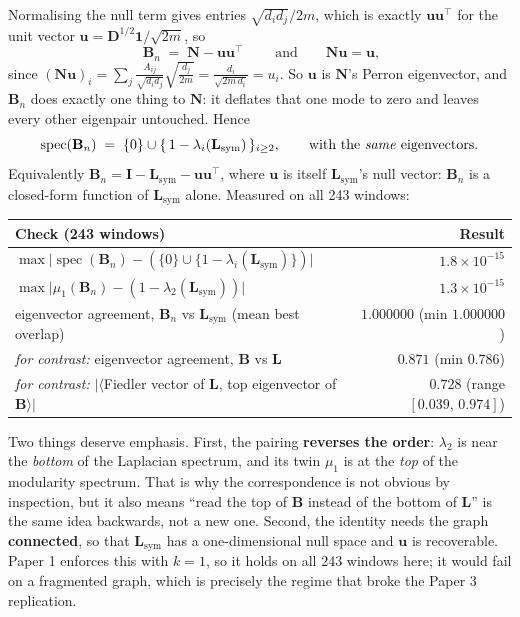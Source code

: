 \documentclass[11pt,a4paper]{article}
\newcommand{\Lap}{\mathbf{L}}
\newcommand{\Bmat}{\mathbf{B}}
\newcommand{\Dmat}{\mathbf{D}}
\newcommand{\Lsym}{\Lap_{\mathrm{sym}}}
\newcommand{\Bn}{\Bmat_{n}}
\begin{document}
Normalising the null term gives entries $\sqrt{d_i d_j}/2m$, which is exactly
$\mathbf{u}\mathbf{u}^{\!\top}$ for the unit vector
$\mathbf{u} = \Dmat^{1/2}\mathbf{1}/\sqrt{2m}$, so
\[
\boxed{\;\Bn \;=\; \mathbf{N} - \mathbf{u}\mathbf{u}^{\!\top}\;}
\qquad\text{and}\qquad
\mathbf{N}\mathbf{u} = \mathbf{u},
\]
since $(\mathbf{N}\mathbf{u})_i = \sum_j \tfrac{A_{ij}}{\sqrt{d_id_j}}\sqrt{\tfrac{d_j}{2m}}
= \tfrac{d_i}{\sqrt{2m\,d_i}} = u_i$. So $\mathbf{u}$ is $\mathbf{N}$'s Perron
eigenvector, and $\Bn$ does exactly one thing to $\mathbf{N}$: it deflates that one
mode to zero and leaves every other eigenpair untouched. Hence
\[
\operatorname{spec}(\Bn) \;=\; \{0\}\cup\{\,1-\lambda_i(\Lsym)\,\}_{i\ge2},
\qquad\text{with the \emph{same} eigenvectors.}
\]
Equivalently $\Bn = \mathbf{I} - \Lsym - \mathbf{u}\mathbf{u}^{\!\top}$, where
$\mathbf{u}$ is itself $\Lsym$'s null vector: $\Bn$ is a closed-form function of
$\Lsym$ alone. Measured on all 243 windows:

\begin{center}\small
\renewcommand{\arraystretch}{1.15}
\begin{tabular}{@{}lr@{}}
\toprule
\textbf{Check (243 windows)} & \textbf{Result} \\
\midrule
$\max\big|\operatorname{spec}(\Bn) - (\{0\}\cup\{1-\lambda_i(\Lsym)\})\big|$ &
$1.8\times10^{-15}$ \\
$\max\big|\mu_1(\Bn) - (1-\lambda_2(\Lsym))\big|$ & $1.3\times10^{-15}$ \\
eigenvector agreement, $\Bn$ vs $\Lsym$ (mean best overlap) &
$\mathbf{1.000000}$ \quad(min $1.000000$) \\[2pt]
\textit{for contrast:} eigenvector agreement, $\Bmat$ vs $\Lap$ &
$0.871$ \quad(min $0.786$) \\
\textit{for contrast:} $|\langle$Fiedler vector of $\Lap$, top eigenvector of
$\Bmat\rangle|$ & $0.728$ \quad(range $[0.039,\,0.974]$) \\
\bottomrule
\end{tabular}
\end{center}

Two things deserve emphasis. First, the pairing \textbf{reverses the order}:
$\lambda_2$ is near the \emph{bottom} of the Laplacian spectrum, and its twin
$\mu_1$ is at the \emph{top} of the modularity spectrum. That is why the
correspondence is not obvious by inspection, but it also means ``read the top
of $\Bmat$ instead of the bottom of $\Lap$'' is the same idea backwards, not a new
one. Second, the identity needs the graph \textbf{connected}, so that $\Lsym$ has a
one-dimensional null space and $\mathbf{u}$ is recoverable. Paper 1 enforces this
with $k=1$, so it holds on all 243 windows here; it would fail on a fragmented
graph, which is precisely the regime that broke the Paper 3 replication.
\end{document}

